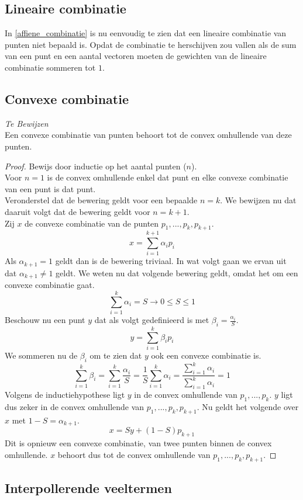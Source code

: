 \documentclass[tmi_notities.tex]{subfiles}
\begin{document}
\subsection{Lineaire combinatie}
In \ref{affiene_combinatie} is nu eenvoudig te zien dat een lineaire combinatie van punten niet bepaald is.
Opdat de combinatie te herschijven zou vallen als de sum van een punt en een aantal vectoren moeten de gewichten van de lineaire combinatie sommeren tot $1$. 

\subsection{Convexe combinatie}
\textit{Te Bewijzen}\\
Een convexe combinatie van punten behoort tot de convex omhullende van deze punten.
\begin{proof}
Bewijs door inductie op het aantal punten ($n$).\\
Voor $n=1$ is de convex omhullende enkel dat punt en elke convexe combinatie van een punt is dat punt.\\
Veronderstel dat de bewering geldt voor een bepaalde $n=k$. We bewijzen nu dat daaruit volgt dat de bewering geldt voor $n=k+1$.\\
Zij $x$ de convexe combinatie van de punten $p_1,...,p_k,p_{k+1}$.
\[
x = \sum_{i=1}^{k+1}\alpha_ip_i
\]
Als $\alpha_{k+1} = 1$ geldt dan is de bewering triviaal. In wat volgt gaan we ervan uit dat $\alpha_{k+1} \neq 1$ geldt.
We weten nu dat volgende bewering geldt, omdat het om een convexe combinatie gaat.
\[
\sum_{i=1}^{k}\alpha_i = S \rightarrow 0 \le S \le 1
\]
Beschouw nu een punt $y$ dat als volgt gedefinieerd is met $\beta_i = \frac{\alpha_i}{S}$.
\[
y = \sum_{i=1}^k\beta_{i}p_{i}
\]
We sommeren nu de $\beta_i$ om te zien dat $y$ ook een convexe combinatie is.
\[
\sum_{i=1}^k\beta_{i} = \sum_{i=1}^k \frac{\alpha_i}{S} = \frac{1}{S}\sum_{i=1}^k \alpha_i = \frac{\sum_{i=1}^{k}\alpha_i}{\sum_{i=1}^{k}\alpha_i} = 1
\]
Volgens de inductiehypothese ligt $y$ in de convex omhullende van $p_1,...,p_k$. $y$ ligt dus zeker in de convex omhullende van $p_1,...,p_k,p_{k+1}$. Nu geldt het volgende over $x$ met $1-S = \alpha_{k+1}$.
\[
x = Sy + (1-S)p_{k+1}
\]
Dit is opnieuw een convexe combinatie, van twee punten binnen de convex omhullende. $x$ behoort dus tot de convex omhullende van $p_1,...,p_k,p_{k+1}$. 
\end{proof}

\subsection{Interpollerende veeltermen}
\end{document}
